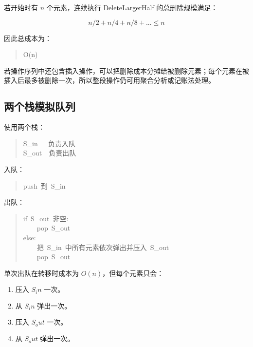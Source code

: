 \documentclass[UTF8,zihao=-4]{ctexart}
\begin{document}
若开始时有 $n$ 个元素，连续执行 DeleteLargerHalf 的总删除规模满足：

\[n/2 + n/4 + n/8 + ... \le  n\]

因此总成本为：

\begin{quote}
\small\ttfamily\raggedright
\relax O(n)\\
\end{quote}

若操作序列中还包含插入操作，可以把删除成本分摊给被删除元素；每个元素在被插入后最多被删除一次，所以整段操作仍可用聚合分析或记账法处理。

\subsection*{两个栈模拟队列}

使用两个栈：

\begin{quote}
\small\ttfamily\raggedright
\relax S\_in\ \ \ 负责入队\\
\relax S\_out\ \ 负责出队\\
\end{quote}

入队：

\begin{quote}
\small\ttfamily\raggedright
\relax push\ 到\ S\_in\\
\end{quote}

出队：

\begin{quote}
\small\ttfamily\raggedright
\relax if\ S\_out\ 非空:\\
\relax \ \ \ \ pop\ S\_out\\
\relax else:\\
\relax \ \ \ \ 把\ S\_in\ 中所有元素依次弹出并压入\ S\_out\\
\relax \ \ \ \ pop\ S\_out\\
\end{quote}

单次出队在转移时成本为 $O(n)$，但每个元素只会：

\begin{enumerate}
\item 压入 $S_in$ 一次。
\item 从 $S_in$ 弹出一次。
\item 压入 $S_out$ 一次。
\item 从 $S_out$ 弹出一次。
\end{enumerate}
\end{document}
